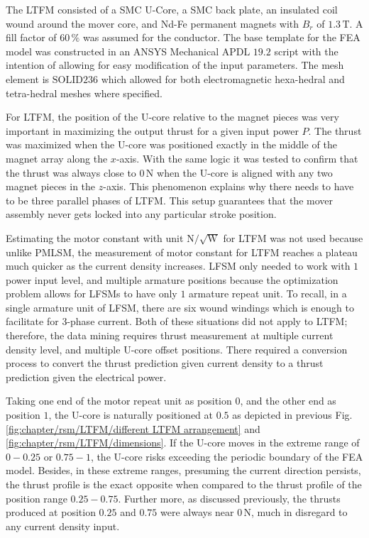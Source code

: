             
            The \acs{LTFM} consisted of a \acs{SMC} U-Core, a \acs{SMC} back plate, an insulated coil wound around the mover core, and Nd-Fe permanent magnets with $B_r$ of $1.3\,\mathrm{T}$. A fill factor of $60\,\%$ was assumed for the conductor.  The base template for the \acs{FEA} model was constructed in an ANSYS Mechanical APDL $19.2$ script with the intention of allowing for easy modification of the input parameters. The mesh element is $\mathrm{SOLID236}$ which allowed for both electromagnetic hexa-hedral and tetra-hedral meshes where specified.
  
            
            For \acs{LTFM}, the position of the U-core relative to the magnet pieces was very important in maximizing the output thrust for a given input power $P$. The thrust was maximized when the U-core was positioned exactly in the middle of the magnet array along the $x$-axis. With the same logic it was tested to confirm that the thrust was always close to $0\,\mathrm{N}$ when the U-core is aligned with any two magnet pieces in the $z$-axis. This phenomenon explains why there needs to have to be three parallel phases of \acs{LTFM}. This setup guarantees that the mover assembly never gets locked into any particular stroke position.
            
            
            Estimating the motor constant with unit $\mathrm{N/\sqrt{W}}$ for \acs{LTFM} was not used because unlike \acs{PMLSM}, the measurement of motor constant for \acs{LTFM} reaches a plateau much quicker as the current density increases. \acs{LFSM} only needed to work with $1$ power input level, and multiple armature positions because the optimization problem allows for \acsp{LFSM} to have only $1$ armature repeat unit. To recall, in a single armature unit of \acs{LFSM}, there are six wound windings which is enough to facilitate for 3-phase current. Both of these situations did not apply to \acs{LTFM}; therefore, the data mining requires thrust measurement at multiple current density level, and multiple U-core offset positions. There required a conversion process to convert the thrust prediction given current density to a thrust prediction given the electrical power.
            
            Taking one end of the motor repeat unit as position $0$, and the other end as position $1$, the U-core is naturally positioned at $0.5$ as depicted in previous Fig.\,\ref{fig:chapter/rsm/LTFM/different LTFM arrangement} and \ref{fig:chapter/rsm/LTFM/dimensions}. If the U-core moves in the extreme range of $0-0.25$ or $0.75-1$, the U-core risks exceeding the periodic boundary of the \acs{FEA} model. Besides, in these extreme ranges, presuming the current direction persists, the thrust profile is the exact opposite when compared to the thrust profile of the position range $0.25-0.75$. Further more, as discussed previously, the thrusts produced at position $0.25$ and $0.75$ were always near $0\,\mathrm{N}$, much in disregard to any current density input. 
            
